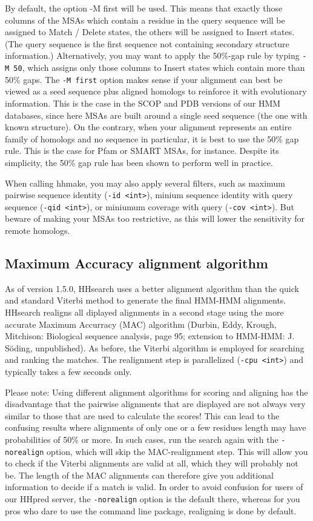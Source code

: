 \documentclass[11pt,a4paper]{article}
\begin{document}
By default, the option -M first will be used. This means that exactly those columns of 
the MSAs which contain a residue in the query sequence will be assigned to Match 
/ Delete states, the others will be assigned to Insert states. (The query sequence is 
the first sequence not containing secondary structure information.) Alternatively, you 
may want to apply the 50\%-gap rule by typing \verb`-M 50`, which assigns only those columns 
to Insert states which contain more than 50\% gaps. The \verb`-M first` option makes sense 
if your alignment can best be viewed as a seed sequence plus aligned homologs to 
reinforce it with evolutionary information. This is the case in the SCOP and PDB 
versions of our HMM databases, since here MSAs are built around a single seed 
sequence (the one with known structure). On the contrary, when your alignment 
represents an entire family of homologs and no sequence in particular, it is best to 
use the 50\% gap rule. This is the case for Pfam or SMART MSAs, for instance. 
Despite its simplicity, the 50\% gap rule has been shown to perform well in practice.

When calling hhmake, you may also apply several filters, such as maximum pairwise 
sequence identity (\verb`-id <int>`), minium sequence identity with query sequence 
(\verb`-qid <int>`), or miniumum coverage with query (\verb`-cov <int>`). But beware 
of making your MSAs too restrictive, as this will lower the sensitivity for remote homologs.


\subsection{Maximum Accuracy alignment algorithm}

As of version 1.5.0, HHsearch uses a better alignment algorithm than the quick and 
standard Viterbi method to generate the final HMM-HMM alignments. HHsearch realigns 
all diplayed alignments in a second stage using the more accurate Maximum Accurracy 
(MAC) algorithm (Durbin, Eddy, Krough, Mitchison: Biological sequence analysis, page 
95; extension to HMM-HMM: J. S\"oding, unpublished). As before, the Viterbi algorithm 
is employed for searching and ranking the matches. The realignment step is 
parallelized (\verb`-cpu <int>`) and typically takes a few seconds only.    

Please note: Using different alignment algorithms for scoring and aligning has the 
disadvantage that the pairwise alignments that are displayed are not always very similar to 
those that are used to calculate the scores! This can lead to the confusing results 
where alignments of only one or a few residues length may have probabilities of 50\% 
or more. In such cases, run the search again with the \verb`-norealign` option, which will 
skip the MAC-realignment step. This will allow you to check if the Viterbi alignments 
are valid at all, which they will probably not be. The length of the MAC alignments 
can therefore give you additional information to decide if a match is valid. In order
to avoid confusion for users of our HHpred server, the \verb`-norealign` option is the 
default there, whereas for you pros who dare to use the command line package, 
realigning is done by default.
\end{document}
